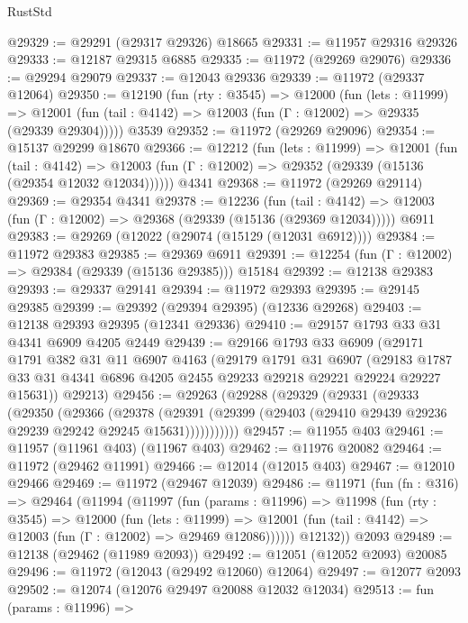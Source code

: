\begin{lexlean}{RustStd}
\begin{coremodule}
@29329 := @29291 (@29317 @29326) @18665
@29331 := @11957 @29316 @29326
@29333 := @12187 @29315 @6885
@29335 := @11972 (@29269 @29076)
@29336 := @29294 @29079
@29337 := @12043 @29336
@29339 := @11972 (@29337 @12064)
@29350 := @12190
    (fun (rty : @3545) =>
    @12000
      (fun (lets : @11999) =>
      @12001 (fun (tail : @4142) => @12003 (fun (Γ : @12002) => @29335 (@29339 @29304)))))
    @3539
@29352 := @11972 (@29269 @29096)
@29354 := @15137 @29299 @18670
@29366 := @12212
    (fun (lets : @11999) =>
    @12001
      (fun (tail : @4142) =>
      @12003 (fun (Γ : @12002) => @29352 (@29339 (@15136 (@29354 @12032 @12034))))))
    @4341
@29368 := @11972 (@29269 @29114)
@29369 := @29354 @4341
@29378 := @12236
    (fun (tail : @4142) => @12003 (fun (Γ : @12002) => @29368 (@29339 (@15136 (@29369 @12034)))))
    @6911
@29383 := @29269 (@12022 (@29074 (@15129 (@12031 @6912))))
@29384 := @11972 @29383
@29385 := @29369 @6911
@29391 := @12254 (fun (Γ : @12002) => @29384 (@29339 (@15136 @29385))) @15184
@29392 := @12138 @29383
@29393 := @29337 @29141
@29394 := @11972 @29393
@29395 := @29145 @29385
@29399 := @29392 (@29394 @29395) (@12336 @29268)
@29403 := @12138 @29393 @29395 (@12341 @29336)
@29410 := @29157 @1793 @33 @31 @4341 @6909 @4205 @2449
@29439 := @29166
    @1793
    @33
    @6909
    (@29171
      @1791
      @382
      @31
      @11
      @6907
      @4163
      (@29179
        @1791
        @31
        @6907
        (@29183 @1787 @33 @31 @4341 @6896 @4205 @2455 @29233 @29218 @29221 @29224 @29227 @15631))
      @29213)
@29456 := @29263
    (@29288
      (@29329
        (@29331
          (@29333
            (@29350
              (@29366
                (@29378
                  (@29391
                    (@29399 (@29403 (@29410 @29439 @29236 @29239 @29242 @29245 @15631)))))))))))
@29457 := @11955 @403
@29461 := @11957 (@11961 @403) (@11967 @403)
@29462 := @11976 @20082
@29464 := @11972 (@29462 @11991)
@29466 := @12014 (@12015 @403)
@29467 := @12010 @29466
@29469 := @11972 (@29467 @12039)
@29486 := @11971
    (fun (fn : @316) =>
    @29464
      (@11994
        (@11997
          (fun (params : @11996) =>
          @11998
            (fun (rty : @3545) =>
            @12000
              (fun (lets : @11999) =>
              @12001 (fun (tail : @4142) => @12003 (fun (Γ : @12002) => @29469 @12086))))))
        @12132))
    @2093
@29489 := @12138 (@29462 (@11989 @2093))
@29492 := @12051 (@12052 @2093) @20085
@29496 := @11972 (@12043 (@29492 @12060) @12064)
@29497 := @12077 @2093
@29502 := @12074 (@12076 @29497 @20088 @12032 @12034)
@29513 := fun (params : @11996) =>

\end{coremodule}
\end{lexlean}
